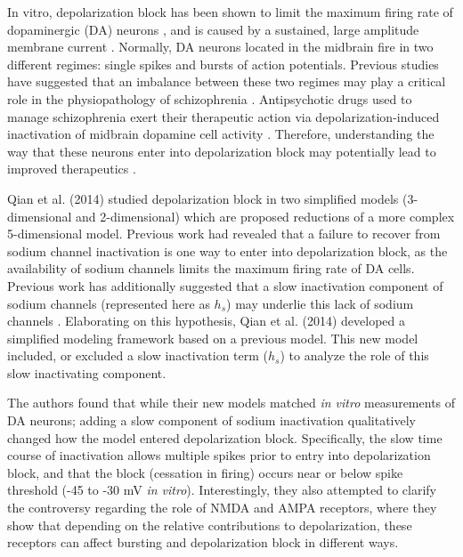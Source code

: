 \newcommand{\colorhref}[2]{\href{#1}{\color{blue}{#2}}}

In vitro, depolarization block has been shown to limit the maximum firing rate of dopaminergic (DA) neurons \cite{Richards1997}, and is caused by a sustained, large amplitude membrane current \cite{Bianchi2012}. Normally, DA neurons located in the midbrain fire in two different regimes: single spikes and bursts of action potentials. Previous studies have suggested that an imbalance between these two regimes may play a critical role in the physiopathology of schizophrenia \cite{Benamer2018}. Antipsychotic drugs used to manage schizophrenia exert their therapeutic action via depolarization-induced inactivation of midbrain dopamine cell activity \cite{Grace1997}. Therefore, understanding the way that these neurons enter into depolarization block may potentially lead to improved therapeutics \cite{Qian2014}.

Qian et al. (2014) studied depolarization block in two simplified models (3-dimensional and 2-dimensional) which are proposed reductions of a more complex 5-dimensional model. Previous work had revealed that a failure to recover from sodium channel inactivation is one way to enter into depolarization block, as the availability of sodium channels limits the maximum firing rate of DA cells\cite{Qian2014, Deister2009,Kuznetsova2010}. Previous work has additionally suggested that a slow inactivation component of sodium channels (represented here as $h_s$) may underlie this lack of sodium channels \cite{Ding2011}. Elaborating on this hypothesis, Qian et al. (2014) developed a simplified modeling framework based on a previous model. This new model included, or excluded a slow inactivation term ($h_s$) to analyze the role of this slow inactivating component.

The authors found that while their new models matched \emph{in vitro} measurements of DA neurons; adding a slow component of sodium inactivation qualitatively changed how the model entered depolarization block. Specifically, the slow time course of inactivation allows multiple spikes prior to entry into depolarization block, and that the block (cessation in firing) occurs near or below spike threshold (-45 to -30 mV \emph{in vitro}). Interestingly, they also attempted to clarify the controversy regarding the role of NMDA and AMPA receptors, where they show that depending on the relative contributions to depolarization, these receptors can affect bursting and depolarization block in different ways. 

